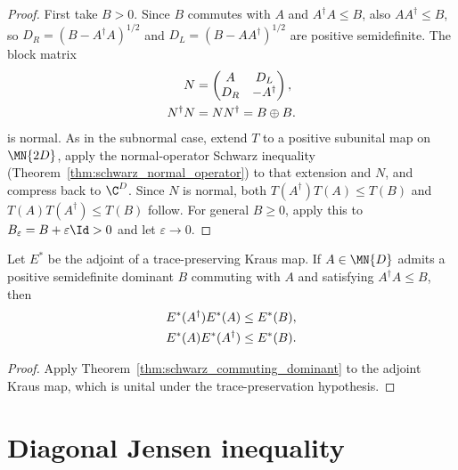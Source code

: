 \begin{proof}
    \leanok
    First take $B>0$. Since $B$ commutes with $A$ and
    $A^\dagger A\le B$, also $AA^\dagger\le B$, so
    $D_R=(B-A^\dagger A)^{1/2}$ and
    $D_L=(B-AA^\dagger)^{1/2}$ are positive semidefinite. The block matrix
    \begin{align}
        N
        &=
        \begin{pmatrix}
            A & D_L \\
            D_R & -A^\dagger
        \end{pmatrix},
        \notag\\
        N^\dagger N
        &=NN^\dagger=B\oplus B.
        \notag
    \end{align}
    is normal. As in the subnormal case, extend $T$ to a positive subunital
    map on $\MN{2D}$, apply the normal-operator Schwarz inequality
    (Theorem~\ref{thm:schwarz_normal_operator}) to that extension and $N$, and
    compress back to $\C^D$. Since $N$ is normal, both
    $T(A^\dagger)T(A)\le T(B)$ and $T(A)T(A^\dagger)\le T(B)$ follow. For
    general $B\ge0$, apply this to
    $B_\varepsilon=B+\varepsilon\Id>0$ and let $\varepsilon\to0$.
\end{proof}

\begin{theorem}\label{thm:ks_commuting_dominant_cp}
    \leanok
    Let $E^*$ be the adjoint of a trace-preserving Kraus map.
    If $A\in\MN{D}$ admits a positive semidefinite dominant $B$
    commuting with $A$ and satisfying $A^\dagger A\le B$, then
    \begin{align}
        E^*(A^\dagger)E^*(A)&\le E^*(B), \notag\\
        E^*(A)E^*(A^\dagger)&\le E^*(B).
        \notag
    \end{align}
\end{theorem}

\begin{proof}
    \leanok
    Apply Theorem~\ref{thm:schwarz_commuting_dominant} to the adjoint
    Kraus map, which is unital under the trace-preservation hypothesis.
\end{proof}

\section{Diagonal Jensen inequality}

